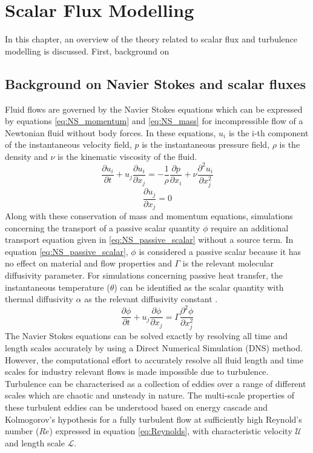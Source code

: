 \chapter{Scalar Flux Modelling}
\label{ch:RANS}

In this chapter, an overview of the theory related to scalar flux and turbulence modelling is discussed. First, background on 

\section{Background on Navier Stokes and scalar fluxes}

Fluid flows are governed by the Navier Stokes equations which can be expressed by equations \ref{eq:NS_momentum} and \ref{eq:NS_mass} for incompressible flow of a Newtonian fluid without body forces. In these equations, $u_{i}$ is the i-th component of the instantaneous velocity field, $p$ is the instantaneous pressure field, $\rho$ is the density and $\nu$ is the kinematic viscosity of the fluid. 
\begin{equation}
\label{eq:NS_momentum}
\frac{\partial u_{i}}{\partial t} + u_{j}\frac{\partial u_{i}}{\partial x_{j}} = -\frac{1}{\rho}\frac{\partial p}{\partial x_{i}} + \nu\frac{\partial^{2} u_{i}}{\partial x_{j}^{2}}
\end{equation}
\begin{equation}
\label{eq:NS_mass}
\frac{\partial u_{j}}{\partial x_{j}} = 0
\end{equation}
Along with these conservation of mass and momentum equations, simulations concerning the transport of a passive scalar quantity $\phi$ require an additional transport equation given in \ref{eq:NS_passive_scalar} without a source term. In equation \ref{eq:NS_passive_scalar}, $\phi$ is considered a passive scalar because it has no effect on material and flow properties and $\Gamma$ is the relevant molecular diffusivity parameter. For simulations concerning passive heat transfer, the instantaneous temperature ($\theta$) can be identified as the scalar quantity with thermal diffusivity $\alpha$ as the relevant diffusivity constant \citep{Leschziner2015}.  
\begin{equation}
\label{eq:NS_passive_scalar}
\frac{\partial \phi}{\partial t} + u_{j}\frac{\partial \phi}{\partial x_{j}} = \Gamma \frac{\partial^{2} \phi}{\partial x_{j}^{2}}
\end{equation}
The Navier Stokes equations can be solved exactly by resolving all time and length scales accurately by using a Direct Numerical Simulation (DNS) method. However, the computational effort to accurately resolve all fluid length and time scales for industry relevant flows is made impossible due to turbulence. Turbulence can be characterised as a collection of eddies over a range of different scales which are chaotic and unsteady in nature. The multi-scale properties of these turbulent eddies can be understood based on energy cascade and Kolmogorov's hypothesis for a fully turbulent flow at sufficiently high Reynold's number ($Re$) expressed in equation \ref{eq:Reynolds}, with characteristic velocity $\mathcal{U}$ and length scale $\mathcal{L}$.
